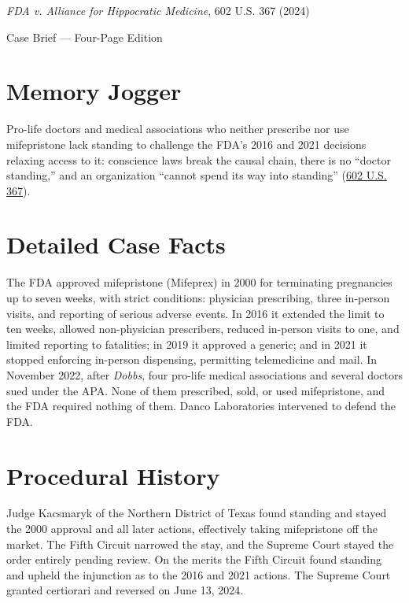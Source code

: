 \documentclass[12pt]{article}
\begin{document}
\begin{center}
{\LARGE \textit{FDA v. Alliance for Hippocratic Medicine}, 602 U.S. 367 (2024)\par}
\vspace{0.8em}
{\large Case Brief --- Four-Page Edition\par}
\end{center}
\vspace{1em}

\section{Memory Jogger}

Pro-life doctors and medical associations who neither prescribe nor use mifepristone lack standing to challenge the FDA's 2016 and 2021 decisions relaxing access to it: conscience laws break the causal chain, there is no ``doctor standing,'' and an organization ``cannot spend its way into standing'' (\href{https://www.supremecourt.gov/opinions/23pdf/602us1r35_bqmd.pdf}{602 U.S. 367}).

\section{Detailed Case Facts}

The FDA approved mifepristone (Mifeprex) in 2000 for terminating pregnancies up to seven weeks, with strict conditions: physician prescribing, three in-person visits, and reporting of serious adverse events. In 2016 it extended the limit to ten weeks, allowed non-physician prescribers, reduced in-person visits to one, and limited reporting to fatalities; in 2019 it approved a generic; and in 2021 it stopped enforcing in-person dispensing, permitting telemedicine and mail. In November 2022, after \textit{Dobbs}, four pro-life medical associations and several doctors sued under the APA. None of them prescribed, sold, or used mifepristone, and the FDA required nothing of them. Danco Laboratories intervened to defend the FDA.

\section{Procedural History}

Judge Kacsmaryk of the Northern District of Texas found standing and stayed the 2000 approval and all later actions, effectively taking mifepristone off the market. The Fifth Circuit narrowed the stay, and the Supreme Court stayed the order entirely pending review. On the merits the Fifth Circuit found standing and upheld the injunction as to the 2016 and 2021 actions. The Supreme Court granted certiorari and reversed on June 13, 2024.
\end{document}
